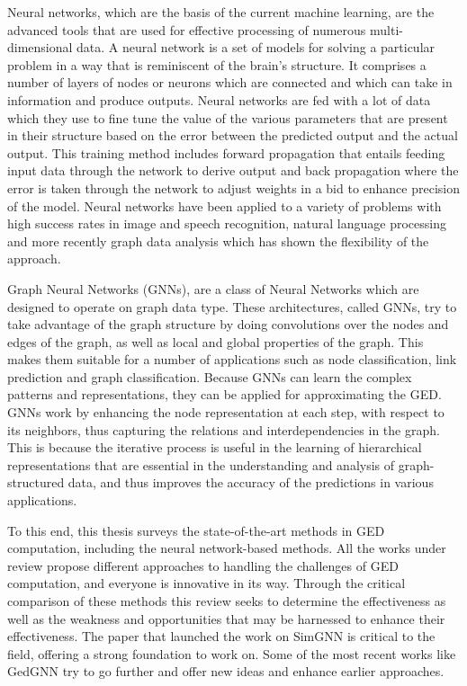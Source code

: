 \documentclass[../Thesis.tex]{subfiles}
\begin{document}
	Neural networks, which are the basis of the current machine learning, are the advanced tools that are used for effective processing of numerous multi-dimensional data. A neural network is a set of models for solving a particular problem in a way that is reminiscent of the brain’s structure. It comprises a number of layers of nodes or neurons which are connected and which can take in information and produce outputs. Neural networks are fed with a lot of data which they use to fine tune the value of the various parameters that are present in their structure based on the error between the predicted output and the actual output. This training method includes forward propagation that entails feeding input data through the network to derive output and back propagation where the error is taken through the network to adjust weights in a bid to enhance precision of the model. Neural networks have been applied to a variety of problems with high success rates in image and speech recognition, natural language processing and more recently graph data analysis which has shown the flexibility of the approach.
	
	Graph Neural Networks (GNNs), are a class of Neural Networks which are designed to operate on graph data type. These architectures, called GNNs, try to take advantage of the graph structure by doing convolutions over the nodes and edges of the graph, as well as local and global properties of the graph. This makes them suitable for a number of applications such as node classification, link prediction and graph classification. Because GNNs can learn the complex patterns and representations, they can be applied for approximating the GED. GNNs work by enhancing the node representation at each step, with respect to its neighbors, thus capturing the relations and interdependencies in the graph. This is because the iterative process is useful in the learning of hierarchical representations that are essential in the understanding and analysis of graph-structured data, and thus improves the accuracy of the predictions in various applications.

	To this end, this thesis surveys the state-of-the-art methods in GED computation, including the neural network-based methods. All the works under review propose different approaches to handling the challenges of GED computation, and everyone is innovative in its way. Through the critical comparison of these methods this review seeks to determine the effectiveness as well as the weakness and opportunities that may be harnessed to enhance their effectiveness. The paper that launched the work on SimGNN \cite{simgnn__a_neural_network_approach_to_fast_graph_similarity_computation} is critical to the field, offering a strong foundation  to work on. Some of the most recent works like GedGNN \cite{computing_graph_edit_distance_via_neural_graph_matching} try to go further and offer new ideas and enhance earlier approaches.
	
\end{document}
